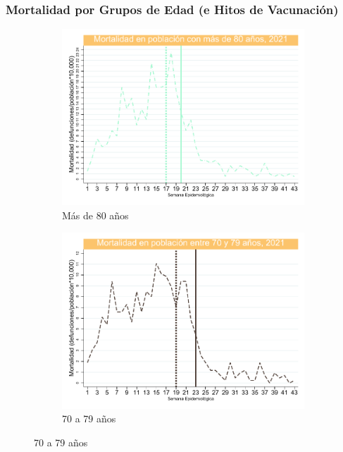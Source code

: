 \documentclass[xcolor=table]{beamer}
\begin{document}
\begin{frame}
		\frametitle{Mortalidad por Grupos de Edad (e Hitos de Vacunación)}
	\vspace{-.5cm}
\begin{figure}
	\centering
	\begin{subfigure}[b]{0.3\textwidth}
		\centering
		\includegraphics[width=\textwidth]{../figuras/mortalidad_edad_80.pdf}
		\caption{Más de 80 años}
	\end{subfigure}
	\hfill
	\begin{subfigure}[b]{0.3\textwidth}
		\centering
		\includegraphics[width=\textwidth]{../figuras/mortalidad_edad_70.pdf}
		\caption{70 a 79 años}
	\end{subfigure}
	\hfill

\end{figure}
\end{frame}
\end{document}
